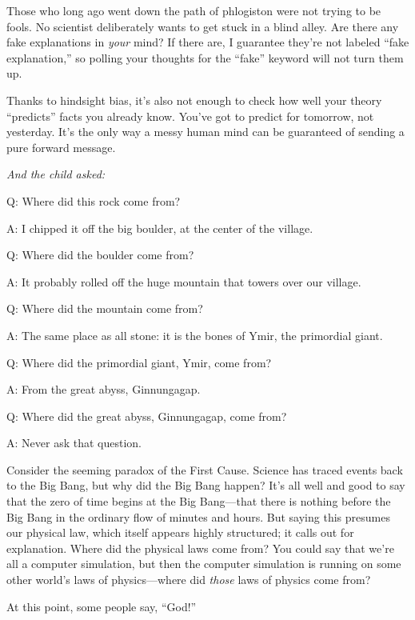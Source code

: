 {
 Those who long ago went down the path of phlogiston were not
trying to be fools. No scientist deliberately wants to get stuck in a
blind alley. Are there any fake explanations in \textit{your} mind? If
there are, I guarantee they're not labeled
``fake explanation,'' so polling
your thoughts for the ``fake''
keyword will not turn them up.}

{
 Thanks to hindsight bias, it's also not enough to
check how well your theory
``predicts'' facts you already know.
You've got to predict for tomorrow, not yesterday.
It's the only way a messy human mind can be guaranteed
of sending a pure forward message.}

\myendsectiontext


\bigskip


{
 \textit{And the child asked:}}

{
 Q: Where did this rock come from?}

{
 A: I chipped it off the big boulder, at the center of the
village.}

{
 Q: Where did the boulder come from?}

{
 A: It probably rolled off the huge mountain that towers over our
village.}

{
 Q: Where did the mountain come from?}

{
 A: The same place as all stone: it is the bones of Ymir, the
primordial giant.}

{
 Q: Where did the primordial giant, Ymir, come from?}

{
 A: From the great abyss, Ginnungagap.}

{
 Q: Where did the great abyss, Ginnungagap, come from?}

{
 A: Never ask that question.}

{
 Consider the seeming paradox of the First Cause. Science has
traced events back to the Big Bang, but why did the Big Bang happen?
It's all well and good to say that the zero of time
begins at the Big Bang---that there is nothing before the Big Bang in
the ordinary flow of minutes and hours. But saying this presumes our
physical law, which itself appears highly structured; it calls out for
explanation. Where did the physical laws come from? You could say that
we're all a computer simulation, but then the computer
simulation is running on some other world's laws of
physics---where did \textit{those} laws of physics come from?}

{
 At this point, some people say,
``God!''}

